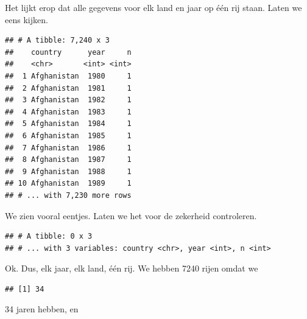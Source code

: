 \documentclass[]{tufte-book}
\newenvironment{Shaded}{}{}
\newcommand{\DecValTok}[1]{\textcolor[rgb]{0.25,0.63,0.44}{#1}}
\newcommand{\KeywordTok}[1]{\textcolor[rgb]{0.00,0.44,0.13}{\textbf{#1}}}
\newcommand{\NormalTok}[1]{#1}
\newcommand{\OperatorTok}[1]{\textcolor[rgb]{0.40,0.40,0.40}{#1}}
\newcommand{\StringTok}[1]{\textcolor[rgb]{0.25,0.44,0.63}{#1}}
\begin{document}
Het lijkt erop dat alle gegevens voor elk land en jaar op één rij staan. Laten we eens kijken.

\begin{Shaded}
\end{Shaded}

\begin{verbatim}
## # A tibble: 7,240 x 3
##    country      year     n
##    <chr>       <int> <int>
##  1 Afghanistan  1980     1
##  2 Afghanistan  1981     1
##  3 Afghanistan  1982     1
##  4 Afghanistan  1983     1
##  5 Afghanistan  1984     1
##  6 Afghanistan  1985     1
##  7 Afghanistan  1986     1
##  8 Afghanistan  1987     1
##  9 Afghanistan  1988     1
## 10 Afghanistan  1989     1
## # ... with 7,230 more rows
\end{verbatim}

We zien vooral eentjes. Laten we het voor de zekerheid controleren.

\begin{Shaded}
\end{Shaded}

\begin{verbatim}
## # A tibble: 0 x 3
## # ... with 3 variables: country <chr>, year <int>, n <int>
\end{verbatim}

Ok. Dus, elk jaar, elk land, één rij. We hebben 7240 rijen omdat we

\begin{Shaded}
\end{Shaded}

\begin{verbatim}
## [1] 34
\end{verbatim}

34 jaren hebben, en
\end{document}
